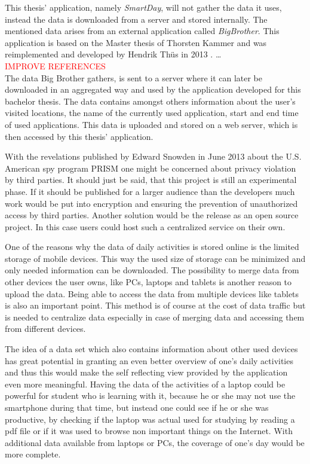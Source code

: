 This  thesis' application, namely \emph{SmartDay}, will not gather the data it uses, instead the data is downloaded from a server and stored internally. The mentioned data arises from an external application called \emph{BigBrother}. This application is based on the Master thesis of Thorsten Kammer \cite{thorstensthesis} and was reimplemented and developed by Hendrik Th\"us in 2013 \cite{bigbrother}. \ldots{} %
\\ \textcolor{red}{IMPROVE REFERENCES}\\
The data Big Brother gathers, is sent to a server where it can later be downloaded in an aggregated way and used by the application developed for this bachelor thesis. The data contains amongst others information about the user's visited locations, the name of the currently used application, start and end time of used applications. This data is uploaded and stored on a web server, which is then accessed by this thesis' application.

With  the revelations published by Edward Snowden in June 2013 about the U.S. American spy program PRISM one might be concerned about privacy violation by third parties. It should just be said, that this project is still an experimental phase. If it should be published for a larger audience than the developers much work would be put into encryption and ensuring the prevention of unauthorized access by third parties. Another solution would be the release as an open source project. In this case users could host such a centralized service on their own.

One  of the reasons why the data of daily activities is stored online is the limited storage of mobile devices. This way the used size of storage can be minimized and only needed information can be downloaded. The possibility to merge data from other devices the user owns, like PCs, laptops and tablets is another reason to upload the data. Being able to access the data from multiple devices like tablets is also an important point. This method is of course at the cost of data traffic but is needed to centralize data especially in case of merging data and accessing them from different devices.

The idea of a data set which also contains information about other used devices has great potential in granting an even better overview of one's daily activities and thus this would make the self reflecting view provided by the application even more meaningful. Having the data of the activities of a laptop could be powerful for student who is learning with it, because he or she may not use the smartphone during that time, but instead one could see if he or she was productive, by checking if the laptop was actual used for studying by reading a pdf file or if it was used to browse non important things on the Internet. With additional data available from laptops or PCs, the coverage of one's day would be more complete.
